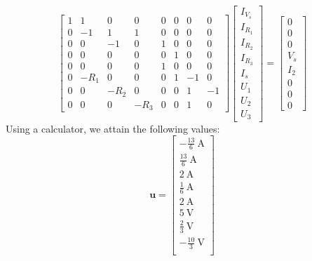 \documentclass[]{article}
\begin{document}
\begin{equation}
	\begin{bmatrix}
	1 & 1 & 0 & 0 & 0 & 0 & 0 & 0 \\
	0 & -1 & 1 & 1 & 0 & 0 & 0 & 0 \\
	0 & 0 & -1 & 0 & 1 & 0 & 0 & 0 \\
	0 & 0 & 0 & 0 & 0 & 1 & 0 & 0 \\
	0 & 0 & 0 & 0 & 1 & 0 & 0 & 0 \\
	0 & -R_1 & 0 & 0 & 0 & 1 & -1 & 0 \\
	0 & 0 & -R_2 & 0 & 0 & 0 & 1 & -1 \\
	0 & 0 & 0 & -R_3 & 0 & 0 & 1 & 0
	\end{bmatrix}
	\begin{bmatrix}
	I_{V_s} \\
	I_{R_1} \\
	I_{R_2} \\
	I_{R_3} \\
	I_s \\
	U_1 \\
	U_2 \\
	U_3
	\end{bmatrix}
	=
	\begin{bmatrix}
	0 \\
	0 \\
	0 \\
	V_s \\
	I_2 \\
	0 \\
	0 \\
	0
	\end{bmatrix}
\end{equation}
Using a calculator, we attain the following values: 
\begin{equation}
	\mathbf{u} = \begin{bmatrix}
	-\frac{13}{6} \ \si{\ampere} \\
	\frac{13}{6} \ \si{\ampere} \\
	2 \ \si{\ampere} \\
	\frac{1}{6} \ \si{\ampere} \\
	2 \ \si{\ampere} \\
	5 \ \si{\volt} \\
	\frac{2}{3} \ \si{\volt} \\
	-\frac{10}{3} \ \si{\volt} \\
	\end{bmatrix}
\end{equation}

\subsection{}
\end{document}
